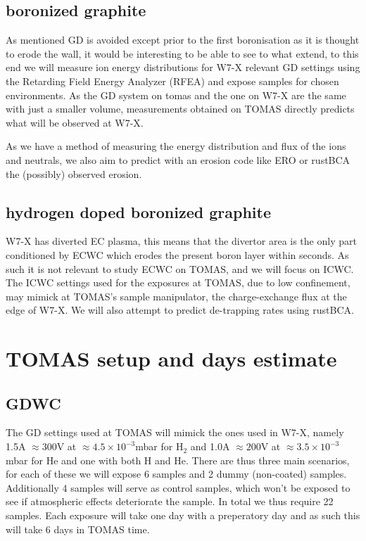 \documentclass{article}
\begin{document}
\subsection*{boronized graphite}
As mentioned GD is avoided except prior to the  first boronisation as it is
thought to erode the wall, it would be interesting to be able to see to
what extend, to this end we will measure ion energy distributions for W7-X
relevant GD settings using the Retarding Field Energy Analyzer (RFEA) and
expose samples for chosen environments.  As the GD system on tomas and the one
on W7-X are the same with just a smaller volume, measurements obtained on TOMAS
directly predicts what will be observed at W7-X.

As we have a method of measuring the energy distribution and flux of the ions
and neutrals, we also aim to predict with an erosion code like ERO or rustBCA
the (possibly) observed erosion. 
\subsection*{hydrogen doped boronized graphite}
W7-X has diverted EC plasma, this means that the divertor area is the only part
conditioned by ECWC which erodes the present boron layer within seconds.  As
such it is not relevant to study ECWC on TOMAS, and we will focus on ICWC.  The
ICWC settings used for the exposures at TOMAS, due to low confinement, may
mimick at TOMAS's sample manipulator, the charge-exchange flux at the edge of
W7-X.  We will also attempt to predict de-trapping rates using rustBCA.
\section{TOMAS setup and days estimate}
\subsection*{GDWC}
The GD settings used at TOMAS will mimick the ones used in W7-X, namely 1.5A
$\approx300$V at $\approx4.5\times10^{-3}$mbar  for H$_2$ and 1.0A $\approx
200$V at $\approx 3.5\times10^{-3}$mbar for He\cite{AndreiNucMatEn} and one with
both H and He.  
There are thus three main scenarios, for each of these we will expose 6 samples
and 2 dummy (non-coated) samples. Additionally 4 samples will serve as control
samples, which won't be exposed to see if atmospheric effects deteriorate the
sample. In total we thus require 22 samples.  Each exposure will take one day
with a preperatory day and as such this will take 6 days in TOMAS time.
\end{document}
